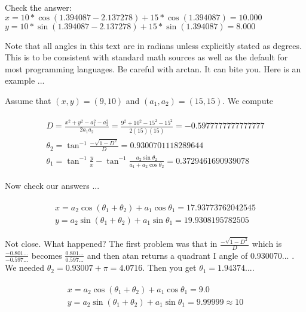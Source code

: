 Check the answer:\\
\(x = 10*\cos(1.394087-2.137278) + 15*\cos(1.394087) = 10.000\)\\
\(y = 10*\sin(1.394087-2.137278) + 15*\sin(1.394087) = 8.000\)

Note that all angles in this text are in radians unless explicitly
stated as degrees. This is to be consistent with standard math sources
as well as the default for most programming languages. Be careful with
arctan. It can bite you. Here is an example ...

Assume that \((x,y) = (9,10)\) and \((a_1, a_2) = (15,15)\). We compute

\[\begin{aligned}
\begin{array}{l}
D = \displaystyle  \frac{x^2 + y^2 - a_1^2 - a_2^2}{2a_1a_2 }
= \displaystyle \frac{9^2 + 10^2 - 15^2 - 15^2}{2(15)(15) } = -0.5977777777777777 \\[4pt]
\theta_2 = \tan^{-1}\displaystyle\frac{-\sqrt{1-D^2}}{D}  = 0.9300701118289644 \\[4pt]
\theta_1 = \tan^{-1}\displaystyle\frac{y}{x} - \tan^{-1} \displaystyle\frac{a_2\sin \theta_2}{a_1 + a_2\cos\theta_2}
         = 0.3729461690939078
\end{array}
\end{aligned}\]

Now check our answers ...

\[\begin{aligned}
\begin{matrix}
x = a_2\cos (\theta_1+\theta_2) + a_1 \cos \theta_1 = 17.93773762042545 \\
y = a_2 \sin (\theta_1 +\theta_2) + a_1\sin \theta_1 = 19.9308195782505
\end{matrix}
\end{aligned}\]

Not close. What happened? The first problem was that in
\(\displaystyle\frac{-\sqrt{1-D^2}}{D}\) which is
\(\displaystyle\frac{-0.801...}{-0.597...}\) becomes
\(\displaystyle\frac{0.801...}{0.597...}\) and then atan returns a
quadrant I angle of 0.930070... . We needed
\(\theta_2 = 0.93007 + \pi = 4.0716\). Then you get
\(\theta_1 = 1.94374...\).

\[\begin{aligned}
\begin{matrix}
x = a_2\cos (\theta_1+\theta_2) + a_1 \cos \theta_1 = 9.0 \\
y = a_2 \sin (\theta_1 +\theta_2) + a_1\sin \theta_1 = 9.99999 \approx 10
\end{matrix}
\end{aligned}\]

